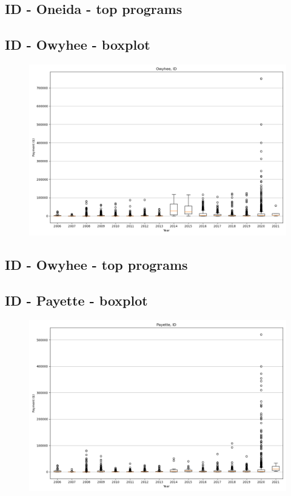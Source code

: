 \subsection*{ID - Oneida - top programs}

\newpage
\subsection*{ID - Owyhee - boxplot}
\begin{figure}[h]
\centering
\includegraphics[width=7in]{../output/boxplots/counties/Owyhee-ID_boxplot.png}
\end{figure}


\subsection*{ID - Owyhee - top programs}

\newpage
\subsection*{ID - Payette - boxplot}
\begin{figure}[h]
\centering
\includegraphics[width=7in]{../output/boxplots/counties/Payette-ID_boxplot.png}
\end{figure}


